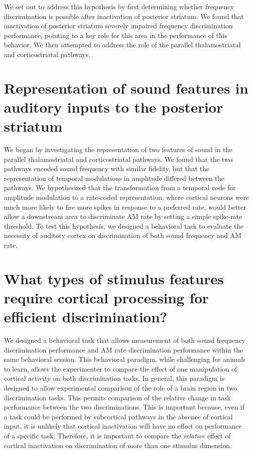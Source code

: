 We set out to address this hypothesis by first determining whether frequency discrimination is possible after inactivation of posterior striatum. 
%
We found that inactivation of posterior striatum severely impaired frequency discrimination performance, pointing to a key role for this area in the performance of this behavior. 
%
We then attempted to address the role of the parallel thalamostriatal and corticostriatal pathways.

\section{Representation of sound features in auditory inputs to the posterior striatum}
We began by investigating the representation of two features of sound in the parallel thalamostriatal and corticostriatal pathways.
%
We found that the two pathways encoded sound frequency with similar fidelity, but that the representation of temporal modulations in amplitude differed between the pathways. 
%
We hypothesized that the transformation from a temporal code for amplitude modulation to a rate-coded representation, where cortical neurons were much more likely to fire more spikes in response to a preferred rate, would better allow a downstream area to discriminate AM rate by setting a simple spike-rate threshold. 
%
To test this hypothesis, we designed a behavioral task to evaluate the necessity of auditory cortex on discrimination of both sound frequency and AM rate. 

\section{What types of stimulus features require cortical processing for efficient discrimination?}

We designed a behavioral task that allows measurement of both sound frequency discrimination performance and AM rate discrimination performance within the same behavioral session.
%
This behavioral paradigm, while challenging for animals to learn, allows the experimenter to compare the effect of one manipulation of cortical activity on both discrimination tasks. 
%
In general, this paradigm is designed to allow experimental comparison of the role of a brain region in two discrimination tasks. 
%
This permits comparison of the relative change in task performance between the two discriminations.
%
This is important because, even if a task could be performed by subcortical pathways in the absence of cortical input, it is unlikely that cortical inactivation will have no effect on performance of a specific task.
%
Therefore, it is important to compare the \emph{relative} effect of cortical inactivation on discrimination of more than one stimulus dimension. 

